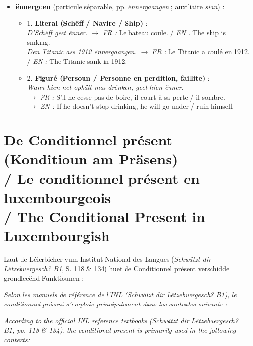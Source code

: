\begin{itemize}
    \item \textbf{ënnergoen} (particule séparable, pp. \textit{ënnergaangen} ; auxiliaire \textit{sinn}) :
    \begin{itemize}
        \item 1. \textbf{Literal (Schëff / Navire / Ship)} : \\
        \textit{D'Schëff geet ënner.} $\rightarrow$ \textit{FR :} Le bateau coule. / \textit{EN :} The ship is sinking. \\
        \textit{Den Titanic ass 1912 ënnergaangen.} $\rightarrow$ \textit{FR :} Le Titanic a coulé en 1912. / \textit{EN :} The Titanic sank in 1912.
        \item 2. \textbf{Figuré (Persoun / Personne en perdition, faillite)} : \\
        \textit{Wann hien net ophält mat drénken, geet hien ënner.} \\
        $\rightarrow$ \textit{FR :} S'il ne cesse pas de boire, il court à sa perte / il sombre. \\
        $\rightarrow$ \textit{EN :} If he doesn't stop drinking, he will go under / ruin himself.
    \end{itemize}
\end{itemize}

\vspace{1.5em}

\section[De Conditionnel présent / Conditional Present]{De Conditionnel présent (Konditioun am Präsens) \\/ Le conditionnel présent en luxembourgeois \\/ The Conditional Present in Luxembourgish}

Laut de Léierbicher vum Institut National des Langues (\textit{Schwätzt dir Lëtzebuergesch? B1}, S. 118 \& 134) huet de Conditionnel présent verschidde grondleeënd Funktiounen :

\textit{Selon les manuels de référence de l'INL (\textit{Schwätzt dir Lëtzebuergesch? B1}), le conditionnel présent s'emploie principalement dans les contextes suivants :}

\textit{According to the official INL reference textbooks (\textit{Schwätzt dir Lëtzebuergesch? B1}, pp. 118 \& 134), the conditional present is primarily used in the following contexts:}

